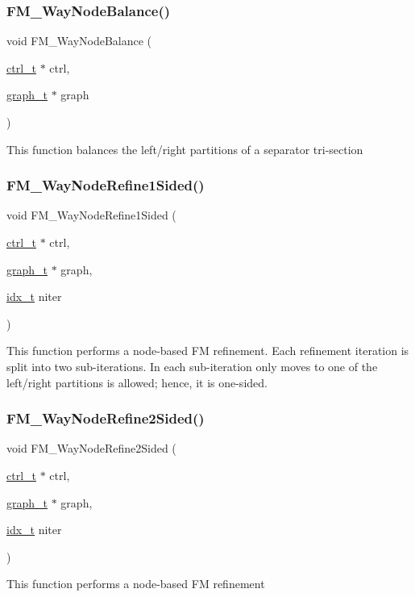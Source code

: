 \subsubsection{\texorpdfstring{F\+M\+\_\+Way\+Node\+Balance()}{FM\_2WayNodeBalance()}}
{\footnotesize\ttfamily void F\+M\+\_\+Way\+Node\+Balance (\begin{DoxyParamCaption}\item[{\hyperlink{a00742}{ctrl\+\_\+t} $\ast$}]{ctrl,  }\item[{\hyperlink{a00734}{graph\+\_\+t} $\ast$}]{graph }\end{DoxyParamCaption})}

This function balances the left/right partitions of a separator tri-\/section \mbox{\label{a00275_a7e2e4362953c8c68c6af01bfcb87d8e1}} 
\subsubsection{\texorpdfstring{F\+M\+\_\+Way\+Node\+Refine1\+Sided()}{FM\_2WayNodeRefine1Sided()}}
{\footnotesize\ttfamily void F\+M\+\_\+Way\+Node\+Refine1\+Sided (\begin{DoxyParamCaption}\item[{\hyperlink{a00742}{ctrl\+\_\+t} $\ast$}]{ctrl,  }\item[{\hyperlink{a00734}{graph\+\_\+t} $\ast$}]{graph,  }\item[{\hyperlink{a00876_aaa5262be3e700770163401acb0150f52}{idx\+\_\+t}}]{niter }\end{DoxyParamCaption})}

This function performs a node-\/based FM refinement. Each refinement iteration is split into two sub-\/iterations. In each sub-\/iteration only moves to one of the left/right partitions is allowed; hence, it is one-\/sided. \mbox{\label{a00275_ac1ce8eab68ef8a71c0a5097be9af5094}} 
\subsubsection{\texorpdfstring{F\+M\+\_\+Way\+Node\+Refine2\+Sided()}{FM\_2WayNodeRefine2Sided()}}
{\footnotesize\ttfamily void F\+M\+\_\+Way\+Node\+Refine2\+Sided (\begin{DoxyParamCaption}\item[{\hyperlink{a00742}{ctrl\+\_\+t} $\ast$}]{ctrl,  }\item[{\hyperlink{a00734}{graph\+\_\+t} $\ast$}]{graph,  }\item[{\hyperlink{a00876_aaa5262be3e700770163401acb0150f52}{idx\+\_\+t}}]{niter }\end{DoxyParamCaption})}

This function performs a node-\/based FM refinement 